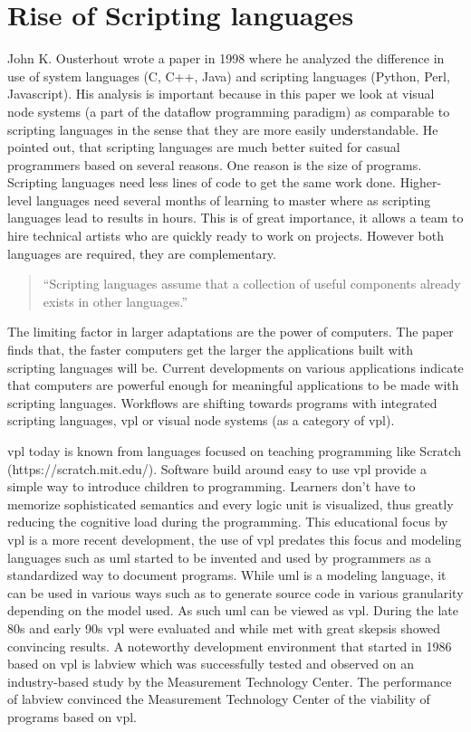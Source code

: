 \documentclass[10pt,a4paper]{article}
\begin{document}
\section{Rise of Scripting languages}
\begin{multicols}{2}
John K. Ousterhout wrote a paper\cite{Ousterhout1998} in 1998 where he analyzed the difference in use of system languages (C, C++, Java) and scripting languages (Python, Perl, Javascript). His analysis is important because in this paper we look at visual node systems (a part of the dataflow programming paradigm\cite{wiki:Dataflow}) as comparable to scripting languages in the sense that they are more easily understandable. He pointed out, that scripting languages are much better suited for casual programmers based on several reasons. One reason is the size of programs. Scripting languages need less lines of code to get the same work done. Higher-level languages need several months of learning to master where as scripting languages lead to results in hours. This is of great importance, it allows a team to hire technical artists who are quickly ready to work on projects. However both languages are required, they are complementary.\begin{quote}
“Scripting languages assume that a collection of useful components already exists in other languages.”\citep[p.~2]{Ousterhout1998}
\end{quote}
The limiting factor in larger adaptations are the power of computers. The paper finds that, the faster computers get the larger the applications built with scripting languages will be. Current developments on various applications indicate that computers are powerful enough for meaningful applications to be made with scripting languages. Workflows are shifting towards programs with integrated scripting languages, \gls{vpl} or visual node systems (as a category of \gls{vpl}).

\gls{vpl} today is known from languages focused on teaching programming like Scratch (https://scratch.mit.edu/). Software build around easy to use \gls{vpl} provide a simple way to introduce children to programming. Learners don’t have to memorize sophisticated semantics and every logic unit is visualized, thus greatly reducing the cognitive load during the programming. This educational focus by \gls{vpl} is a more recent development, the use of \gls{vpl} predates this focus and modeling languages such as \gls{uml} started to be invented and used by programmers as a standardized way to document programs. While \gls{uml} is a modeling language, it can be used in various ways such as to generate source code\cite{VisualStudioDocsContributors2016} in various granularity depending on the model used. As such \gls{uml} can be viewed as \gls{vpl}. During the late 80s and early 90s \gls{vpl} were evaluated and while met with great skepsis showed convincing results\cite{WHITLEY1997}. A noteworthy development environment that started in 1986 based on \gls{vpl} is \gls{labview} which was successfully tested and observed on an industry-based study by the Measurement Technology Center\cite{Jamal}. The performance of \gls{labview} convinced the Measurement Technology Center of the viability of programs based on \gls{vpl}.


\end{multicols}
\end{document}
